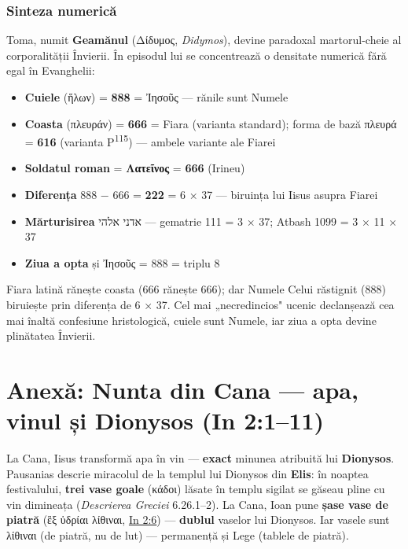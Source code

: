 \documentclass[12pt,a4paper,twoside,openany]{book}
\begin{document}
\subsection{Sinteza numerică}

Toma, numit \textbf{Geamănul} (Δίδυμος, \textit{Didymos}), devine paradoxal martorul-cheie al corporalității Învierii. În episodul lui se concentrează o densitate numerică fără egal în Evanghelii:

\begin{itemize}
  \item \textbf{Cuiele} (ἥλων) = \textbf{888} = Ἰησοῦς --- rănile sunt Numele
  \item \textbf{Coasta} (πλευράν) = \textbf{666} = Fiara (varianta standard); forma de bază πλευρά = \textbf{616} (varianta P\textsuperscript{115}) --- ambele variante ale Fiarei
  \item \textbf{Soldatul roman} = \textbf{Λατεῖνος} = \textbf{666} (Irineu)
  \item \textbf{Diferența} 888 − 666 = \textbf{222} = 6 × 37 --- biruința lui Iisus asupra Fiarei
  \item \textbf{Mărturisirea} אדני אלהי --- gematrie 111 = 3 × 37; Atbash 1099 = 3 × 11 × 37
  \item \textbf{Ziua a opta} și Ἰησοῦς = 888 = triplu 8
\end{itemize}

Fiara latină rănește coasta (666 rănește 666); dar Numele Celui răstignit (888) biruiește prin diferența de 6 × 37. Cel mai „necredincios" ucenic declanșează cea mai înaltă confesiune hristologică, cuiele sunt Numele, iar ziua a opta devine plinătatea Învierii.

\chapter{Anexă: Nunta din Cana — apa, vinul și Dionysos (In 2:1--11)}\label{cana}

La Cana, Iisus transformă apa în vin — \textbf{exact} minunea atribuită lui \textbf{Dionysos}. Pausanias descrie miracolul de la templul lui Dionysos din \textbf{Elis}: în noaptea festivalului, \textbf{trei vase goale} (κάδοι) lăsate în templu sigilat se găseau pline cu vin dimineața (\textit{Descrierea Greciei} 6.26.1--2). La Cana, Ioan pune \textbf{șase vase de piatră} (ἓξ ὑδρίαι λίθιναι, \href{https://bibliaortodoxa.ro/carte.php?id=35\&cap=2\#6}{In 2:6}) — \textbf{dublul} vaselor lui Dionysos. Iar vasele sunt λίθιναι (de piatră, nu de lut) — permanență și Lege (tablele de piatră).
\end{document}

